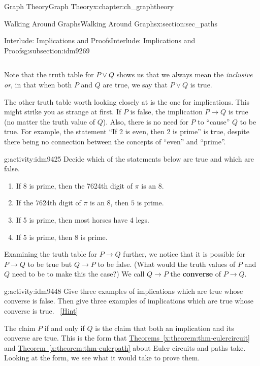 \documentclass[oneside,10pt,]{book}
\newcommand{\terminology}[1]{\textbf{#1}}
\numberwithin{equation}{chapter}
\def\imp{\rightarrow}
\begin{document}
\begin{chapterptx}{Graph Theory}{}{Graph Theory}{}{}{x:chapter:ch_graphtheory}
\begin{sectionptx}{Walking Around Graphs}{}{Walking Around Graphs}{}{}{x:section:sec_paths}
\begin{subsectionptx}{Interlude: Implications and Proofs}{}{Interlude: Implications and Proofs}{}{}{g:subsection:idm9269}
\begin{sidebyside}{4}{0.025}{0.025}{0.05}
\begin{sbspanel}{0.2}
{\begin{tabular}{cBc}
\end{tabular}
\par}
\end{sbspanel}%
\end{sidebyside}%
\par
Note that the truth table for \(P \vee Q\) shows us that we always mean the \emph{inclusive or}, in that when both \(P\) and \(Q\) are true, we say that \(P \vee Q\) is true.%
\par
The other truth table worth looking closely at is the one for implications.  This might strike you as strange at first.  If \(P\) is false, the implication \(P \imp Q\) is true (no matter the truth value of \(Q\)).  Also, there is no need for \(P\) to ``cause'' \(Q\) to be true.  For example, the statement ``If 2 is even, then 2 is prime'' is true, despite there being no connection between the concepts of ``even'' and ``prime''.%
\begin{activity}{}{g:activity:idm9425}%
Decide which of the statements below are true and which are false.%
\begin{enumerate}[font=\bfseries,label=(\alph*),ref=\alph*]
\item{}If 8 is prime, then the 7624th digit of \(\pi\) is an 8.%
\item{}If the 7624th digit of \(\pi\) is an 8, then \(5\) is prime.%
\item{}If 5 is prime, then most horses have 4 legs.%
\item{}If 5 is prime, then 8 is prime.%
\end{enumerate}
\end{activity}
Examining the truth table for \(P \imp Q\) further, we notice that it is possible for \(P \imp Q\) to be true but \(Q \imp P\) to be false. (What would the truth values of \(P\) and \(Q\) need to be to make this the case?) We call \(Q \imp P\) the \terminology{converse} of \(P \imp Q\).%
\begin{activity}{}{g:activity:idm9448}%
Give three examples of implications which are true whose converse is false.  Then give three examples of implications which are true whose converse is true.%
\qquad~\hfill{\tiny\hyperlink{g:hint:idm9451-back}{[Hint]}}\end{activity}
The claim \(P\) if and only if \(Q\) is the claim that both an implication and its converse are true.  This is the form that \hyperref[x:theorem:thm-eulercircuit]{Theorems~\ref{x:theorem:thm-eulercircuit}} and \hyperref[x:theorem:thm-eulerpath]{Theorem~\ref{x:theorem:thm-eulerpath}} about Euler circuits and paths take.  Looking at the form, we see what it would take to prove them.%

\end{subsectionptx}
\end{sectionptx}
\end{chapterptx}
\end{document}
